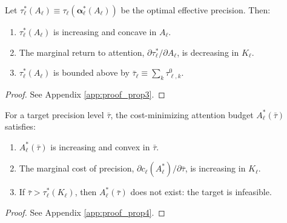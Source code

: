 \begin{proposition}\label{prop:precision_response}
Let $\tau^*_\ell(A_\ell) \equiv \tau_\ell(\boldsymbol{\alpha}^*_\ell(A_\ell))$ be the optimal effective precision. Then:
\begin{enumerate}[label=(\roman*)]
\item $\tau^*_\ell(A_\ell)$ is increasing and concave in $A_\ell$.
\item The marginal return to attention, $\partial \tau^*_\ell / \partial A_\ell$, is decreasing in $K_\ell$.
\item $\tau^*_\ell(A_\ell)$ is bounded above by $\bar{\tau}_\ell \equiv \sum_k \tau^0_{\ell,k}$.
\end{enumerate}
\end{proposition}

\begin{proof}
See Appendix \ref{app:proof_prop3}.
\end{proof}

\begin{proposition}\label{prop:cost_min}
For a target precision level $\bar{\tau}$, the cost-minimizing attention budget $A^*_\ell(\bar{\tau})$ satisfies:
\begin{enumerate}[label=(\roman*)]
\item $A^*_\ell(\bar{\tau})$ is increasing and convex in $\bar{\tau}$.
\item The marginal cost of precision, $\partial c_\ell(A^*_\ell) / \partial \bar{\tau}$, is increasing in $K_\ell$.
\item If $\bar{\tau} > \tau^*_\ell(K_\ell)$, then $A^*_\ell(\bar{\tau})$ does not exist: the target is infeasible.
\end{enumerate}
\end{proposition}

\begin{proof}
See Appendix \ref{app:proof_prop4}.
\end{proof}

